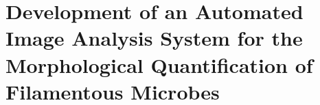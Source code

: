 \chapter{Development of an Automated Image Analysis System for the Morphological Quantification of Filamentous Microbes}\label{ch:DevImagAnal}









